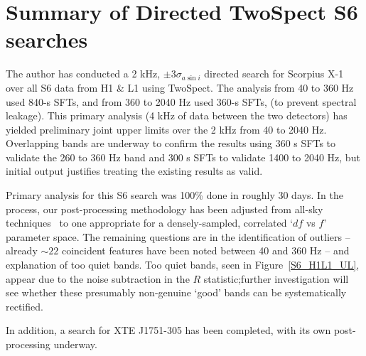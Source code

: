 \section{Summary of Directed TwoSpect S6 searches}

The author has conducted a 2 kHz, $\pm 3 \sigma_{a \sin i}$ directed search for Scorpius X-1 over all S6 data from H1 \& L1 using TwoSpect.
The analysis from 40 to 360 Hz used 840-s SFTs,
and from 360 to 2040 Hz used 360-s SFTs,
(to prevent spectral leakage).
This primary analysis (4 kHz of data between the two detectors) has yielded preliminary joint upper limits over the 2 kHz from 40 to 2040 Hz.
Overlapping bands are underway to confirm the results using
360 s SFTs to validate the 260 to 360 Hz band and
300 s SFTs to validate 1400 to 2040 Hz, but initial output justifies treating the existing results as valid. 

Primary analysis for this S6 search was 100\% done in roughly 30 days.
In the process, our post-processing methodology has been adjusted from all-sky techniques~\cite{GoetzTwoSpectResults2014} to one appropriate for a densely-sampled, correlated `$df$ vs $f$' parameter space.
The remaining questions are in the identification of outliers -- already $\sim 22$ coincident features have been noted between 40 and 360 Hz -- and explanation of too quiet bands.
Too quiet bands, seen in Figure~\ref{S6_H1L1_UL}, appear due to the noise subtraction in the $R$ statistic;further investigation will see whether these presumably non-genuine `good' bands can be systematically rectified.

In addition, a search for XTE J1751-305 has been completed, with its own post-processing underway.



